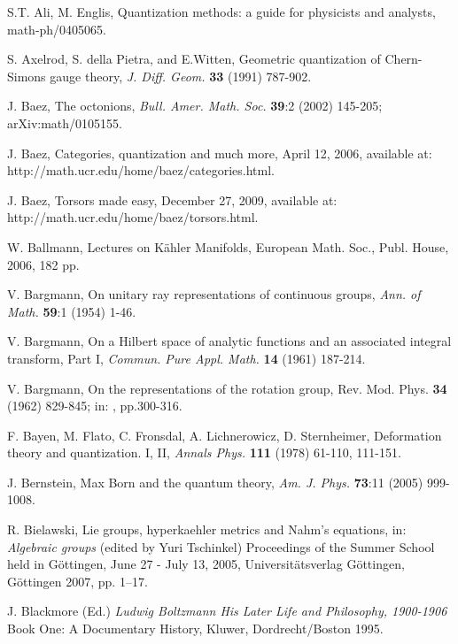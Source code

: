 \begin{thebibliography}{000}

 S.T. Ali, M. Englis, Quantization methods: a guide for
physicists and analysts, math-ph/0405065.

 S. Axelrod, S. della Pietra, and E.Witten, Geometric
quantization of Chern-Simons gauge theory, {\it J. Diff. Geom.} {\bf 33} (1991)
787-902.

 J. Baez, The octonions, {\it Bull. Amer. Math. Soc.} 
{\bf 39}:2 (2002) 145-205; arXiv:math/0105155.

 J. Baez, Categories, quantization and much more, April 12,
2006, available at: http://math.ucr.edu/home/baez/categories.html.

 J. Baez, Torsors made easy, December 27, 2009,
available at: http://math.ucr.edu/home/baez/torsors.html.

 W. Ballmann, {Lectures on K\"ahler Manifolds}, European Math.
Soc., Publ. House, 2006, 182 pp.

 V. Bargmann, On unitary ray representations of continuous
groups, {\it Ann. of Math.} {\bf 59}:1 (1954) 1-46.

 V. Bargmann, On a Hilbert space of analytic functions and an
associated integral transform, Part I, {\it Commun. Pure Appl. Math.} {\bf 14} 
(1961) 187-214.

 V. Bargmann, On the representations of the rotation group,
Rev. Mod. Phys. {\bf34} (1962) 829-845; in: \cite{QTAM}, pp.300-316.

 F. Bayen, M. Flato, C. Fronsdal, A. Lichnerowicz, D. Sternheimer,
Deformation theory and quantization. I, II,
{\it Annals Phys.} {\bf 111} (1978) 61-110, 111-151.

 J. Bernstein, Max Born and the quantum theory, {\it Am. J. 
Phys.} {\bf 73}:11 (2005) 999-1008.

 R. Bielawski, Lie groups, hyperkaehler metrics and Nahm's equations, in: 
{\it Algebraic groups} (edited by Yuri Tschinkel) Proceedings of the Summer School held in 
G\"ottingen, June 27 - July 13, 2005, Universit\"atsverlag G\"ottingen, G\"ottingen 2007, pp. 1--17. 

 J. Blackmore (Ed.) {\it Ludwig Boltzmann His Later Life and Philosophy, 1900-1906} 
Book One: A Documentary History, Kluwer, Dordrecht/Boston 1995.


\end{thebibliography}
